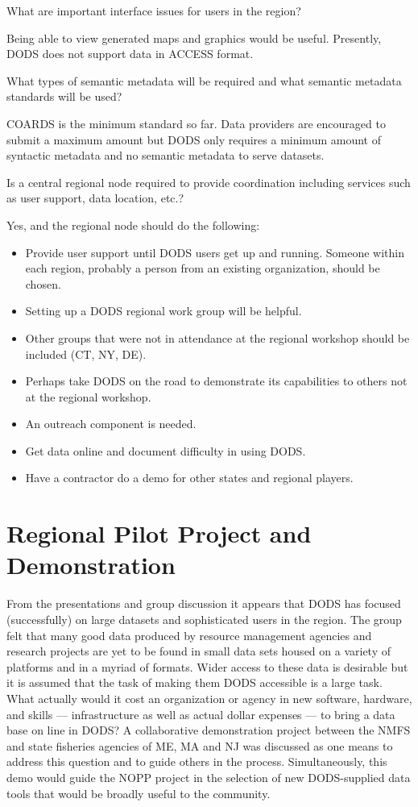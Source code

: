 What are important interface issues for users in the region?

Being able to view generated maps and graphics would be useful.
Presently, DODS does not support data in ACCESS format.

What types of semantic metadata will be required and what semantic
metadata standards will be used?

COARDS is the minimum standard so far.  Data providers are encouraged
to submit a maximum amount but DODS only requires a minimum amount of
syntactic metadata and no semantic metadata to serve datasets.

Is a central regional node required to provide coordination including
services such as user support, data location, etc.?

Yes, and the regional node should do the following:
\begin{itemize}
\item Provide user support until DODS users get up and running.
  Someone within each region, probably a person from an existing
  organization, should be chosen.
\item Setting up a DODS regional work group will be helpful.
\item Other groups that were not in attendance at the regional
  workshop should be included (CT, NY, DE).
\item Perhaps take DODS on the road to demonstrate its capabilities to
  others not at the regional workshop.
\item An outreach component is needed.
\item Get data online and document difficulty in using DODS.
\item Have a contractor do a demo for other states and regional players.
\end{itemize}

\section{Regional Pilot Project and Demonstration}

From the presentations and group discussion it appears that DODS has
focused (successfully) on large datasets and sophisticated users in
the region.  The group felt that many good data produced by resource
management agencies and research projects are yet to be found in small
data sets housed on a variety of platforms and in a myriad of
formats.  Wider access to these data is desirable but it is assumed
that the task of making them DODS accessible is a large task.  What
actually would it cost an organization or agency in new software,
hardware, and skills --- infrastructure as well as actual dollar
expenses --- to bring a data base on line in DODS?  A collaborative
demonstration project between the NMFS and state fisheries agencies of
ME, MA and NJ was discussed as one means to address this question and
to guide others in the process. Simultaneously, this demo would guide
the NOPP project in the selection of new DODS-supplied data tools that would be
broadly useful to the community.

